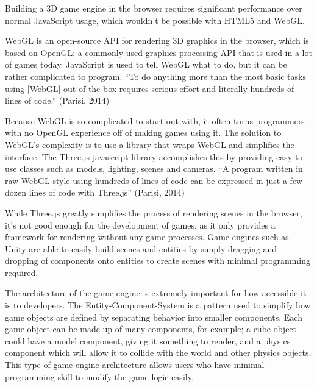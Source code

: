 \documentclass[a4paper, 12pt]{article}
\begin{document}


Building a 3D game engine in the browser requires significant performance over normal JavaScript usage, which wouldn't be possible with HTML5 and WebGL. 



WebGL is an open-source API for rendering 3D graphics in the browser, which is based on OpenGL; a commonly used graphics processing API that is used in a lot of games today. JavaScript is used to tell WebGL what to do, but it can be rather complicated to program. ``To do anything more than the most basic tasks using [WebGL] out of the box requires serious effort and literally hundreds of lines of code.'' (Parisi, 2014)



Because WebGL is so complicated to start out with, it often turns programmers with no OpenGL experience off of making games using it. The solution to WebGL's complexity is to use a library that wraps WebGL and simplifies the interface. The Three.js javascript library accomplishes this by providing easy to use classes such as models, lighting, scenes and cameras. ``A program written in raw WebGL style using hundreds of lines of code can be expressed in just a few dozen lines of code with Three.js'' (Parisi, 2014)



While Three.js greatly simplifies the process of rendering scenes in the browser, it's not good enough for the development of games, as it only provides a framework for rendering without any game processes. Game engines such as Unity are able to easily build scenes and entities by simply dragging and dropping of components onto entities to create scenes with minimal programming required. 



The architecture of the game engine is extremely important for how accessible it is to developers. The Entity-Component-System is a pattern used to simplify how game objects are defined by separating behavior into smaller components. Each game object can be made up of many components, for example; a cube object could have a model component, giving it something to render, and a physics component which will allow it to collide with the world and other physics objects. This type of game engine architecture allows users who have minimal programming skill to modify the game logic easily.
\end{document}
